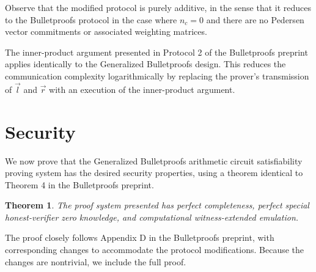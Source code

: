 \documentclass{article}
\newtheorem*{theorem}{Theorem}
\begin{document}
Observe that the modified protocol is purely additive, in the sense that it reduces to the Bulletproofs protocol in the case where $n_c = 0$ and there are no Pedersen vector commitments or associated weighting matrices.

The inner-product argument presented in Protocol 2 of the Bulletproofs preprint applies identically to the Generalized Bulletproofs design.
This reduces the communication complexity logarithmically by replacing the prover's transmission of $\vec{l}$ and $\vec{r}$ with an execution of the inner-product argument.


\section{Security}

We now prove that the Generalized Bulletproofs arithmetic circuit satisfiability proving system has the desired security properties, using a theorem identical to Theorem 4 in the Bulletproofs preprint.

\begin{theorem}
	The proof system presented has perfect completeness, perfect special honest-verifier zero knowledge, and computational witness-extended emulation.
\end{theorem}

The proof closely follows Appendix D in the Bulletproofs preprint, with corresponding changes to accommodate the protocol modifications.
Because the changes are nontrivial, we include the full proof.
\end{document}
